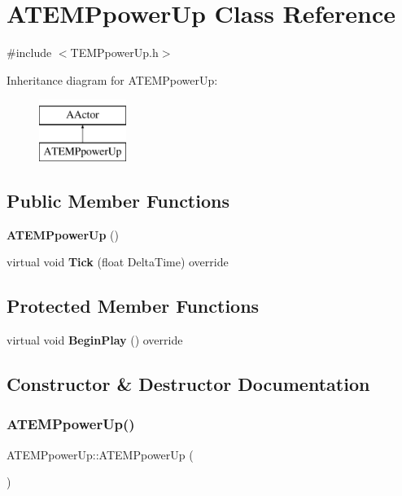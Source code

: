 \section{A\+T\+E\+M\+Ppower\+Up Class Reference}
\label{class_a_t_e_m_ppower_up}


{\ttfamily \#include $<$T\+E\+M\+Ppower\+Up.\+h$>$}

Inheritance diagram for A\+T\+E\+M\+Ppower\+Up\+:\begin{figure}[H]
\begin{center}
\leavevmode
\includegraphics[height=2.000000cm]{class_a_t_e_m_ppower_up}
\end{center}
\end{figure}
\subsection*{Public Member Functions}
\begin{DoxyCompactItemize}
\item 
\textbf{ A\+T\+E\+M\+Ppower\+Up} ()
\item 
virtual void \textbf{ Tick} (float Delta\+Time) override
\end{DoxyCompactItemize}
\subsection*{Protected Member Functions}
\begin{DoxyCompactItemize}
\item 
virtual void \textbf{ Begin\+Play} () override
\end{DoxyCompactItemize}


\subsection{Constructor \& Destructor Documentation}
\mbox{\label{class_a_t_e_m_ppower_up_a7f0c78810dfb49dd7699b906d7e41f1b}} 
\subsubsection{ATEMPpowerUp()}
{\footnotesize\ttfamily A\+T\+E\+M\+Ppower\+Up\+::\+A\+T\+E\+M\+Ppower\+Up (\begin{DoxyParamCaption}{ }\end{DoxyParamCaption})}



